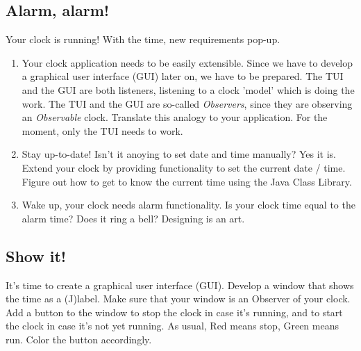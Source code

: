 \begin{multicols}{2}
\subsection*{Alarm, alarm!} 

Your clock is running! With the time, new requirements pop-up. 

\begin{enumerate}[label=\Alph*]
\item Your clock application needs to be easily extensible. Since we have to develop 
a graphical user interface (GUI) later on, we have to be prepared. The TUI and the GUI
are both listeners, listening to a clock 'model' which is doing the work. The TUI and the
GUI are so-called \textit{Observers}, since they are observing an \textit{Observable} clock.
Translate this analogy to your application. For the moment, only the TUI needs to work.

\item Stay up-to-date! Isn't it anoying to set date and time manually? Yes it is. Extend your
clock by providing functionality to set the current date / time. Figure out how to get to know
the current time using the Java Class Library.

\item Wake up, your clock needs alarm functionality. Is your clock time equal to the alarm
time? Does it ring a bell? Designing is an art.


\end{enumerate}
\end{multicols}
\Sep
\begin{multicols}{2}
\subsection*{Show it!} 

It's time to create a graphical user interface (GUI). Develop a window that shows the time
as a (J)label. Make sure that your window is an Observer of your clock. Add a button to the
window to stop the clock in case it's running, and to start the clock in case it's not yet running.
As usual, Red means stop, Green means run. Color the button accordingly.

\end{multicols}
\Sep
